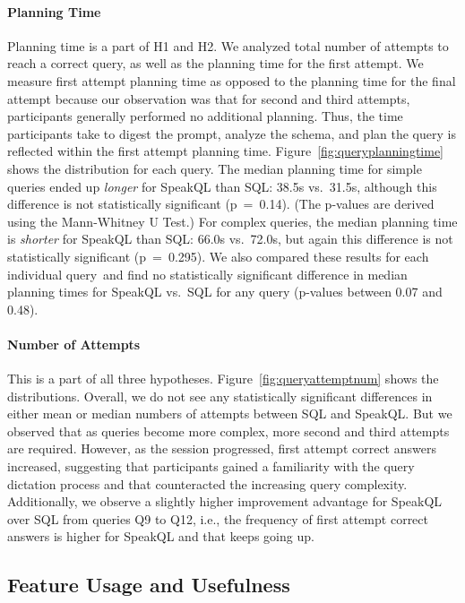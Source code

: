 \paragraph{\textbf{Planning Time}} 
Planning time is a part of H1 and H2. 
We analyzed total number of attempts to reach a correct query, as well as the planning time for the first attempt. 
We measure first attempt planning time as opposed to the planning time for the final attempt because our observation was that for second and third attempts, participants generally performed no additional planning.
Thus, the time participants take to digest the prompt, analyze the schema, and plan the query is reflected within the first attempt planning time. 
Figure~\ref{fig:queryplanningtime} shows the distribution for each query. 
The median planning time for simple queries ended up \textit{longer} for SpeakQL than SQL: 38.5s vs.~31.5s, although this difference is not statistically significant (p~=~0.14). (The p-values are derived using the Mann-Whitney U Test.) 
For complex queries, the median planning time is \textit{shorter} for SpeakQL than SQL: 66.0s vs.~72.0s, but again this difference is not statistically significant (p~=~0.295). 
We also compared these results for each individual query and find no statistically significant difference in median planning times for SpeakQL vs.~SQL for any query (p-values between 0.07 and 0.48). 

\paragraph{\textbf{Number of Attempts}}
This is a part of all three hypotheses. 
Figure~\ref{fig:queryattemptnum} shows the distributions. 
Overall, we do not see any statistically significant differences in either mean or median numbers of attempts between SQL and SpeakQL. 
But we observed that as queries become more complex, more second and third attempts are required. 
However, as the session progressed, first attempt correct answers increased, suggesting that participants gained a familiarity with the query dictation process and that counteracted the increasing query complexity. 
Additionally, we observe a slightly higher improvement advantage for SpeakQL over SQL from queries Q9 to Q12, i.e., the frequency of first attempt correct answers is higher for SpeakQL and that keeps going up.



\subsection{Feature Usage and Usefulness}

